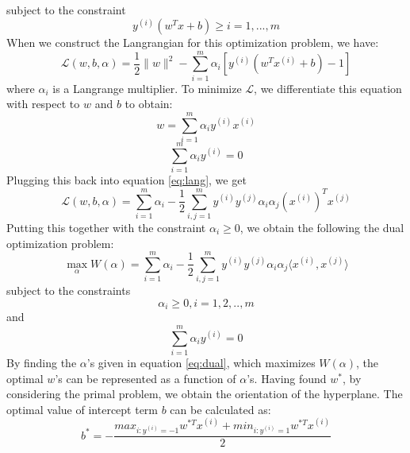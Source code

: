 \documentclass[%
        submission,
        notitlepage,
        narroweqnarray,
        inline,
        ]{ieee}
\begin{document}
subject to the constraint
\begin{equation}
y^{(i)}(w^Tx + b) \geq i = 1, ..., m
\end{equation}
When we construct the Langrangian for this optimization problem, we have:
\begin{equation} \label{eq:lang}
\mathcal {L}(w, b, \alpha) = \frac{1}{2} \parallel w \parallel ^2 - \sum_{i=1}^{m} \alpha_i [y^{(i)}(w^Tx^{(i)} + b) - 1]
\end{equation}
where $\alpha_{i}$ is a Langrange multiplier. To minimize $\mathcal{L}$, we differentiate this equation with respect to $w$ and $b$ to obtain:
\begin{equation} \label{eq:w}
w = \sum_{i=1}^{m} \alpha_{i} y^{(i)} x^{(i)}
\end{equation}
\begin{equation} \label{eq:ay}
\sum_{i=1}^{m} \alpha_{i} y^{(i)} = 0
\end{equation}
Plugging this back into equation \ref{eq:lang}, we get
\begin{equation}
\mathcal {L}(w, b, \alpha) = \sum_{i=1}^{m} \alpha_i - \frac{1}{2} \sum_{i,j=1}^{m} y^{(i)}y^{(j)}\alpha_i \alpha_j (x^{(i)})^T x^{(j)}
\end{equation}
Putting this together with the constraint $\alpha_i \geq 0$, we obtain the following the dual optimization problem:
\begin{equation} \label{eq:dual}
\max_{\alpha} W(\alpha) = \sum_{i=1}^{m} \alpha_i - \frac{1}{2} \sum_{i,j=1}^{m} y^{(i)}y^{(j)}\alpha_i \alpha_j \langle x^{(i)}, x^{(j)}\rangle
\end{equation}
subject to the constraints
\begin{equation}
\alpha_{i} \geq 0, i = 1,2,..,m
\end{equation}
and
\begin{equation}
\sum_{i=1}^{m} \alpha_{i}y^{(i)} = 0
\end{equation}
By finding the $\alpha$'s given in equation \ref{eq:dual}, which maximizes $W(\alpha)$, the optimal $w$'s can be represented as a function of $\alpha$'s.
Having found $w^{*}$, by considering the primal problem, we obtain the orientation of the hyperplane.
The optimal value of intercept term $b$ can be calculated as:
\begin{equation}
b^{*} = - \frac {max_{i:y^{(i)}=-1}w^{*T}x^{(i)} + min_{i:y^{(i)}=1}w^{*T}x^{(i)}} {2}
\end{equation}
\end{document}
